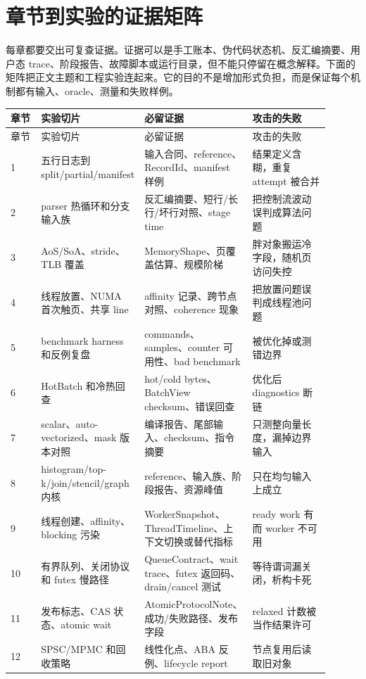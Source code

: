 \section{章节到实验的证据矩阵}

每章都要交出可复查证据。证据可以是手工账本、伪代码状态机、反汇编摘要、用户态 trace、阶段报告、故障脚本或运行目录，但不能只停留在概念解释。下面的矩阵把正文主题和工程实验连起来。它的目的不是增加形式负担，而是保证每个机制都有输入、oracle、测量和失败样例。

\begin{longtable}{@{}p{0.11\linewidth}p{0.25\linewidth}p{0.27\linewidth}p{0.27\linewidth}@{}}
\toprule
章节 & 实验切片 & 必留证据 & 攻击的失败 \\
\midrule
\endfirsthead
\toprule
章节 & 实验切片 & 必留证据 & 攻击的失败 \\
\midrule
\endhead
1 & 五行日志到 split/partial/manifest & 输入合同、reference、RecordId、manifest 样例 & 结果定义含糊，重复 attempt 被合并 \\
2 & parser 热循环和分支输入族 & 反汇编摘要、短行/长行/坏行对照、stage time & 把控制流波动误判成算法问题 \\
3 & AoS/SoA、stride、TLB 覆盖 & MemoryShape、页覆盖估算、规模阶梯 & 胖对象搬运冷字段，随机页访问失控 \\
4 & 线程放置、NUMA 首次触页、共享 line & affinity 记录、跨节点对照、coherence 现象 & 把放置问题误判成线程池问题 \\
5 & benchmark harness 和反例复盘 & commands、samples、counter 可用性、bad benchmark & 被优化掉或测错边界 \\
6 & HotBatch 和冷热回查 & hot/cold bytes、BatchView checksum、错误回查 & 优化后 diagnostics 断链 \\
7 & scalar、auto-vectorized、mask 版本对照 & 编译报告、尾部输入、checksum、指令摘要 & 只测整向量长度，漏掉边界输入 \\
8 & histogram/top-k/join/stencil/graph 内核 & reference、输入族、阶段报告、资源峰值 & 只在均匀输入上成立 \\
9 & 线程创建、affinity、blocking 污染 & WorkerSnapshot、ThreadTimeline、上下文切换或替代指标 & ready work 有而 worker 不可用 \\
10 & 有界队列、关闭协议和 futex 慢路径 & QueueContract、wait trace、futex 返回码、drain/cancel 测试 & 等待谓词漏关闭，析构卡死 \\
11 & 发布标志、CAS 状态、atomic wait & AtomicProtocolNote、成功/失败路径、发布字段 & relaxed 计数被当作结果许可 \\
12 & SPSC/MPMC 和回收策略 & 线性化点、ABA 反例、lifecycle report & 节点复用后读取旧对象 \\

\end{longtable}
